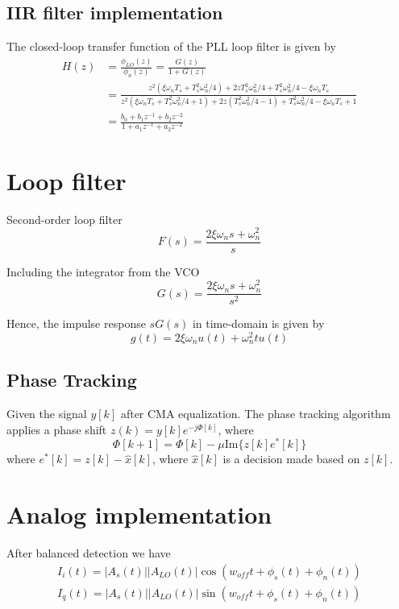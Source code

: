 \documentclass[a4paper]{article}
\begin{document}
\subsection{IIR filter implementation}
The closed-loop transfer function of the PLL loop filter is given by
\begin{align} \nonumber
H(z) &= \frac{\phi_{LO}(z)}{\phi_n(z)} = \frac{G(z)}{1 + G(z)} \\ \nonumber
&= \frac{z^2(\xi\omega_nT_s + T_s^2\omega_n^2/4) + 2zT_s^2\omega_n^2/4 + T_s^2\omega_n^2/4 - \xi\omega_nT_s}{z^2(\xi\omega_nT_s + T_s^2\omega_n^2/4 + 1) + 2z(T_s^2\omega_n^2/4-1) + T_s^2\omega_n^2/4 - \xi\omega_nT_s + 1} \\
& = \frac{b_0 + b_1z^{-1} + b_2z^{-2}}{1 + a_1z^{-1} + a_2z^{-2}}
\end{align}

\section{Loop filter}

Second-order loop filter
\begin{equation}
F(s) = \frac{2\xi\omega_ns + \omega_n^2}{s}
\end{equation}

Including the integrator from the VCO
\begin{equation}
G(s) = \frac{2\xi\omega_ns + \omega_n^2}{s^2}
\end{equation}

Hence, the impulse response $sG(s)$ in time-domain is given by
\begin{equation}
g(t) = 2\xi\omega_nu(t) + \omega_n^2tu(t)
\end{equation}


\subsection{Phase Tracking}
\cite{Phase1995}

Given the signal $y[k]$ after CMA equalization. The phase tracking algorithm applies a phase shift $z(k) = y[k]e^{-j\Phi[k]}$, where
\begin{equation}
\Phi[k+1] = \Phi[k]-\mu\mathrm{Im}\{z[k]e^*[k]\}
\end{equation}
where $e^*[k] = z[k] - \hat{x}[k]$, where $\hat{x}[k]$ is a decision made based on $z[k]$.

\section{Analog implementation}
After balanced detection we have
\begin{align}
I_i(t) = |A_s(t)||A_{LO}(t)|\cos(w_{off}t + \phi_s(t) + \phi_n(t)) \\
I_q(t) = |A_s(t)||A_{LO}(t)|\sin(w_{off}t + \phi_s(t) + \phi_n(t))
\end{align}
\end{document}
